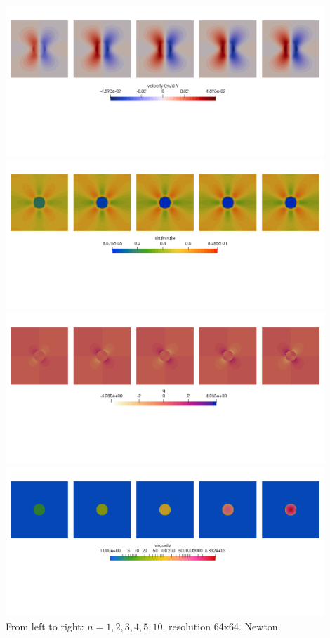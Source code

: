 \begin{center}
\includegraphics[width=12cm]{python_codes/fieldstone_87/results/experiment_05/v.png}\\
\includegraphics[width=12cm]{python_codes/fieldstone_87/results/experiment_05/sr.png}\\
\includegraphics[width=12cm]{python_codes/fieldstone_87/results/experiment_05/press.png}\\
\includegraphics[width=12cm]{python_codes/fieldstone_87/results/experiment_05/eta.png}\\
{\captionfont From left to right: $n=1,2,3,4,5,10$. resolution 64x64. Newton.}
\end{center}

